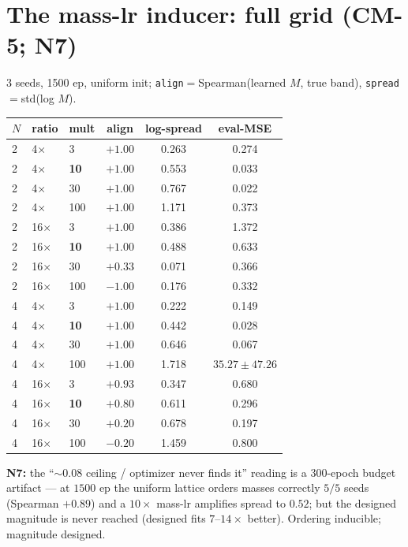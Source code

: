 \documentclass[11pt]{article}
\begin{document}
\section{The mass-lr inducer: full grid (CM-5; N7)}
$3$ seeds, 1500 ep, uniform init; \texttt{align}$=$Spearman(learned $M$, true band), \texttt{spread}$=$std(log $M$).
\begin{center}\small
\begin{tabular}{lllccc}
\toprule
$N$ & ratio & mult & align & log-spread & eval-MSE \\
\midrule
2 & 4$\times$ & 3 & $+1.00$ & 0.263 & 0.274 \\
2 & 4$\times$ & \textbf{10} & $+1.00$ & 0.553 & 0.033 \\
2 & 4$\times$ & 30 & $+1.00$ & 0.767 & 0.022 \\
2 & 4$\times$ & 100 & $+1.00$ & 1.171 & 0.373 \\
2 & 16$\times$ & 3 & $+1.00$ & 0.386 & 1.372 \\
2 & 16$\times$ & \textbf{10} & $+1.00$ & 0.488 & 0.633 \\
2 & 16$\times$ & 30 & $+0.33$ & 0.071 & 0.366 \\
2 & 16$\times$ & 100 & $-1.00$ & 0.176 & 0.332 \\
4 & 4$\times$ & 3 & $+1.00$ & 0.222 & 0.149 \\
4 & 4$\times$ & \textbf{10} & $+1.00$ & 0.442 & 0.028 \\
4 & 4$\times$ & 30 & $+1.00$ & 0.646 & 0.067 \\
4 & 4$\times$ & 100 & $+1.00$ & 1.718 & $35.27\pm47.26$ \\
4 & 16$\times$ & 3 & $+0.93$ & 0.347 & 0.680 \\
4 & 16$\times$ & \textbf{10} & $+0.80$ & 0.611 & 0.296 \\
4 & 16$\times$ & 30 & $+0.20$ & 0.678 & 0.197 \\
4 & 16$\times$ & 100 & $-0.20$ & 1.459 & 0.800 \\
\bottomrule
\end{tabular}
\end{center}
\textbf{N7:} the ``$\sim0.08$ ceiling / optimizer never finds it'' reading is a $300$-epoch budget artifact --- at $1500$ ep the uniform lattice orders masses correctly $5/5$ seeds (Spearman $+0.89$) and a $10\times$ mass-lr amplifies spread to $0.52$; but the designed magnitude is never reached (designed fits $7$--$14\times$ better). Ordering inducible; magnitude designed.
\end{document}

